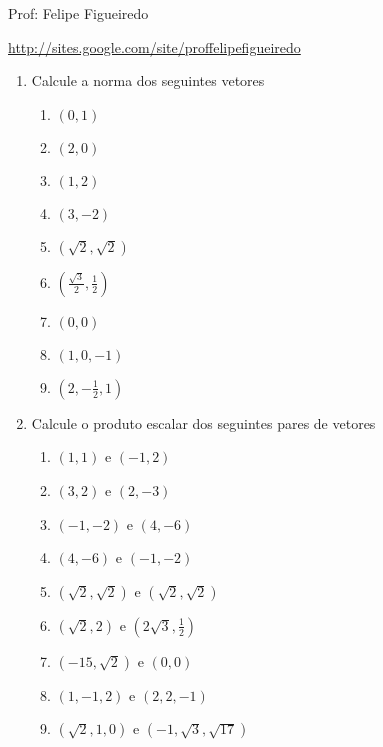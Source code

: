 \documentclass[a4paper]{article}
\begin{document}
\parbox[c]{.825\textwidth}{\raggedright%
{Prof: Felipe Figueiredo\par}
{\url{http://sites.google.com/site/proffelipefigueiredo}}

\vspace{1cm}
}



\begin{enumerate}
\item Calcule a norma dos seguintes vetores
  \begin{enumerate}
  \item $(0,1)$
  \item $(2,0)$
  \item $(1,2)$
  \item $(3,-2)$
  \item $(\sqrt{2},\sqrt{2})$
  \item $(\frac{\sqrt{3}}{2},\frac{1}{2})$
  \item $(0,0)$
  \item $(1,0,-1)$
  \item $(2,-\frac{1}{2},1)$
  \end{enumerate}
  
\item Calcule o produto escalar dos seguintes pares de vetores

  \begin{enumerate}
  \item $(1,1)$ e $(-1,2)$
  \item $(3,2)$ e $(2,-3)$
  \item $(-1,-2)$ e $(4,-6)$
  \item $(4,-6)$ e $(-1,-2)$
  \item $(\sqrt{2},\sqrt{2})$ e $(\sqrt{2},\sqrt{2})$
  \item $(\sqrt{2},2)$ e $(2\sqrt{3},\frac{1}{2})$
  \item $(-15,\sqrt{2})$ e $(0,0)$
  \item $(1,-1,2)$ e $(2,2,-1)$
  \item $(\sqrt{2},1,0)$ e $(-1,\sqrt{3},\sqrt{17})$

  \end{enumerate}


\end{enumerate}
\end{document}
